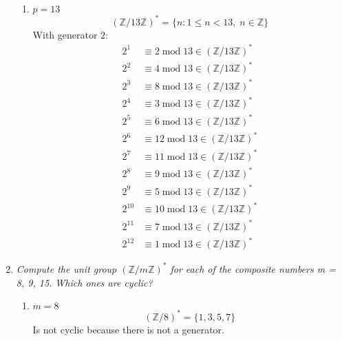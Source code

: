 \documentclass[12pt]{article}
\newcommand{\Z}{\mathbb{Z}}
\renewcommand{\mod}{\; \text{mod}\; }
\begin{document}
\begin{enumerate}[label=(\alph*)]
\begin{enumerate}
                \item $p = 13$
                \[(\Z/13\Z)^* = \{n: 1 \leq n < 13, \; n \in \Z\}\]
                With generator $2$:
                \begin{align*}
                    2^1 &\equiv 2 \mod 13 \in (\Z/13\Z)^*\\
                    2^2 &\equiv 4 \mod 13 \in (\Z/13\Z)^*\\
                    2^3 &\equiv 8 \mod 13 \in (\Z/13\Z)^*\\
                    2^4 &\equiv 3 \mod 13 \in (\Z/13\Z)^*\\
                    2^5 &\equiv 6 \mod 13 \in (\Z/13\Z)^*\\
                    2^6 &\equiv 12 \mod 13 \in (\Z/13\Z)^*\\
                    2^7 &\equiv 11 \mod 13 \in (\Z/13\Z)^*\\
                    2^8 &\equiv 9 \mod 13 \in (\Z/13\Z)^*\\
                    2^9 &\equiv 5 \mod 13 \in (\Z/13\Z)^*\\
                    2^{10} &\equiv 10 \mod 13 \in (\Z/13\Z)^*\\
                    2^{11} &\equiv 7 \mod 13 \in (\Z/13\Z)^*\\
                    2^{12} &\equiv 1 \mod 13 \in (\Z/13\Z)^*
                \end{align*}
            \end{enumerate}
        \color{black}

        \item \emph{Compute the unit group $(\Z/ m\Z)^*$ for each of the composite numbers m = 8, 9, 15. Which ones are cyclic?}
        
        \color{blue}
            \begin{enumerate}
                \item $m = 8$
                \[(\Z/8)^* = \{1, 3, 5, 7\}\]
                Is not cyclic because there is not a generator. 


\end{enumerate}
\end{enumerate}
\end{document}
